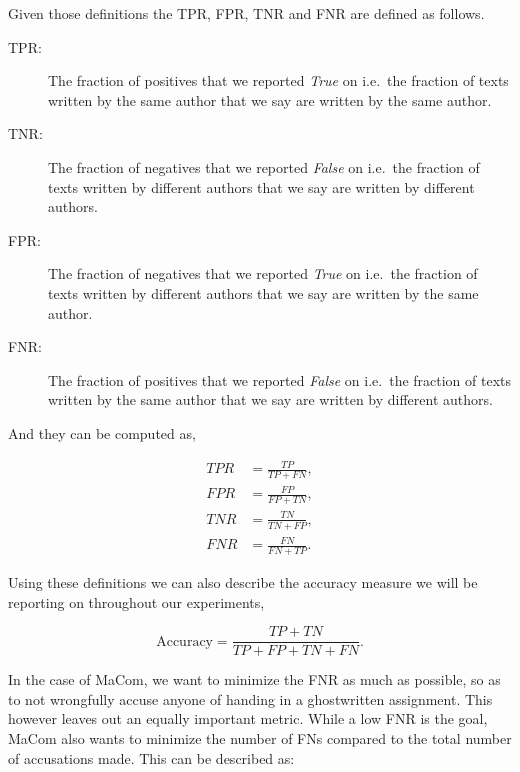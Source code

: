 Given those definitions the \gls{TPR}, \gls{FPR}, \gls{TNR} and \gls{FNR}
are defined as follows.

\begin{description}
    \item[\gls{TPR}: ]

        The fraction of positives that we reported \textit{True} on i.e.~the
        fraction of texts written by the same author that we say are written by
        the same author.

    \item[\gls{TNR}: ]

        The fraction of negatives that we reported \textit{False} on i.e.~the
        fraction of texts written by different authors that we say are written
        by different authors.

    \item[\gls{FPR}: ]

        The fraction of negatives that we reported \textit{True} on i.e.~the
        fraction of texts written by different authors that we say are written
        by the same author.

    \item[\gls{FNR}: ]

        The fraction of positives that we reported \textit{False} on i.e.~the
        fraction of texts written by the same author that we say are written by
        different authors.

\end{description}

And they can be computed as,

\begin{align}
    TPR &= \frac{TP}{TP + FN}, \\
    FPR &= \frac{FP}{FP + TN}, \\
    TNR &= \frac{TN}{TN + FP}, \\
    FNR &= \frac{FN}{FN + TP}.
\end{align}

Using these definitions we can also describe the accuracy measure we will be
reporting on throughout our experiments,

\begin{equation}
    \text{Accuracy} = \frac{TP + TN}{TP + FP + TN + FN}.
\end{equation}

In the case of MaCom, we want to minimize the \gls{FNR} as much as possible,
so as to not wrongfully accuse anyone of handing in a ghostwritten assignment.
This however leaves out an equally important metric. While a low \gls{FNR} is
the goal, MaCom also wants to minimize the number of \glspl{FN} compared to the
total number of accusations made. This can be described as:

